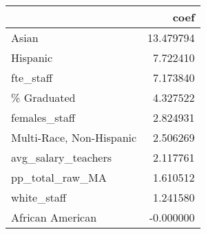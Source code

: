 \begin{tabular}{lr}
\toprule
{} &       coef \\
\midrule
Asian                    &  13.479794 \\
Hispanic                 &   7.722410 \\
fte\_staff                &   7.173840 \\
\% Graduated              &   4.327522 \\
females\_staff            &   2.824931 \\
Multi-Race, Non-Hispanic &   2.506269 \\
avg\_salary\_teachers      &   2.117761 \\
pp\_total\_raw\_MA          &   1.610512 \\
white\_staff              &   1.241580 \\
African American         &  -0.000000 \\
\bottomrule
\end{tabular}
